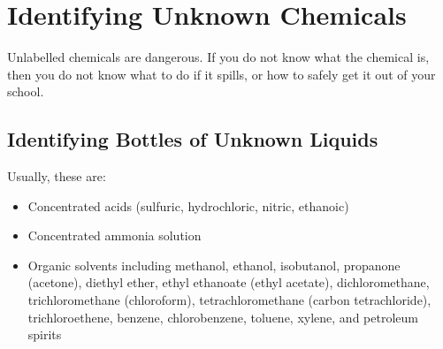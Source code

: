 \chapter{Identifying Unknown Chemicals} 
\label{cha:unknownchemicals}
Unlabelled chemicals are dangerous. 
If you do not know what the chemical is, 
then you do not know what to do if it spills, 
or how to safely get it out of your school.

\section{Identifying Bottles of Unknown Liquids}

Usually, 
these are:
\begin{itemize}
\item Concentrated acids (sulfuric, 
hydrochloric, 
nitric, 
ethanoic)
\item Concentrated ammonia solution
\item Organic solvents including methanol, 
ethanol, 
isobutanol, 
propanone (acetone), 
diethyl ether, 
ethyl ethanoate (ethyl acetate), 
dichloromethane, 
trichloromethane (chloroform), 
tetrachloromethane (carbon tetrachloride), 
trichloroethene, 
benzene, 
chlorobenzene, 
toluene, 
xylene, 
and petroleum spirits
\end{itemize}

